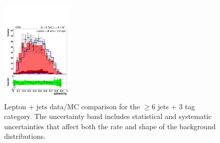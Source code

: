 \begin{figure}[hbtp]
\begin{center}
   \includegraphics[width=0.31\textwidth]{Figures/Analysis_1_Diagrams/d2MCPlots_sphericity_cut6_jge6_t3_Combined_HtWgt.pdf}
   \hspace{0.055\textwidth}
   \caption{Lepton + jets data/MC comparison for the $\ge$6 jets + 3 tag category.  The uncertainty band includes statistical and systematic uncertainties that affect both the rate and shape of the background distributions.}
   \label{fig:lj_input_6j_3t_part2}
 \end{center}
\end{figure}


%
%

\clearpage

